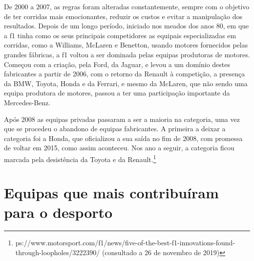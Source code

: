 \documentclass{report}
\begin{document}
De 2000 a 2007, as regras foram alteradas constantemente, sempre com o objetivo de ter corridas mais emocionantes, reduzir os custos e evitar a manipulação dos resultados. Depois de um longo período, iniciado nos meados dos anos 80, em que a \ac{f1} tinha como os seus principais competidores as equipais especializadas em corridas, como  a Williams, McLaren e Benetton, usando motores fornecidos pelas grandes fábricas, a \ac{f1} voltou a ser dominada pelas equipas produtoras de motores. Começou com a criação, pela Ford, da Jaguar, e levou a um domínio destes fabricantes a partir de 2006, com  o retorno da Renault à competição, a presença da BMW, Toyota, Honda e da Ferrari, e mesmo da McLaren, que não sendo uma equipa produtora de motores, passou a ter uma participação importante da Mercedes-Benz.\vspace{5mm}

Após 2008 as equipas privadas passaram a ser a maioria na categoria, uma vez que se procedeu o abandono de equipas fabricantes. A primeira a deixar a categoria foi a Honda, que oficializou a sua saída no fim de 2008, com promessa de voltar em 2015, como assim aconteceu. Nos ano a seguir, a categoria ficou marcada pela desistência da Toyota e da Renault.\footnote[1]{ps://www.motorsport.com/f1/news/five-of-the-best-f1-innovations-found-through-loopholes/3222390/ (consultado a 26 de novembro de 2019)}

\section{Equipas que mais contribuíram para o desporto}
\end{document}
